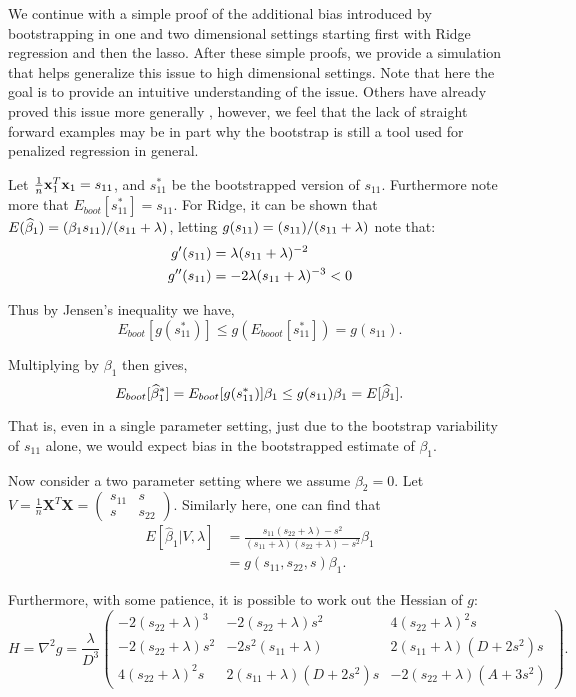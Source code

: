 We continue with a simple proof of the additional bias introduced by bootstrapping in one and two dimensional settings starting first with Ridge regression and then the lasso. After these simple proofs, we provide a simulation that helps generalize this issue to high dimensional settings. Note that here the goal is to provide an intuitive understanding of the issue. Others have already proved this issue more generally \citep{karoui2016, clarté2024}, however, we feel that the lack of straight forward examples may be in part why the bootstrap is still a tool used for penalized regression in general.

Let $\frac{1}{n}\mathbf{x}_1^T\mathbf{x}_1 = s_{11}$, and $s_{11}^*$ be the bootstrapped version of $s_{11}$. Furthermore note more that $E_{boot}[s_{11}^*] = s_{11}$. For Ridge, it can be shown that $E(\widehat{\beta}_1) = (\beta_1s_{11})/(s_{11} + \lambda)$, letting $g(s_{11}) = (s_{11})/(s_{11} + \lambda)$ note that:
$$
\begin{aligned}
g'(s_{11}) &= \lambda (s_{11} + \lambda)^{-2} \\
g''(s_{11}) &= -2\lambda (s_{11} + \lambda)^{-3} < 0
\end{aligned}
$$

\noindent Thus by Jensen's inequality we have,
$$
E_{boot}[g(s_{11}^*)] \leq g(E_{booot}[s_{11}^*]) = g(s_11).
$$

\noindent Multiplying by $\beta_1$ then gives,
$$
E_{boot}[\widehat{\beta}_1^*] = E_{boot}[g(s_{11}^*)]\beta_1 \leq g(s_{11})\beta_1 = E[\widehat{\beta}_1].
$$

\noindent That is, even in a single parameter setting, just due to the bootstrap variability of $s_{11}$ alone, we would expect bias in the bootstrapped estimate of $\beta_1$.

Now consider a two parameter setting where we assume $\beta_2 = 0$. Let $V = \frac{1}{n}\boldsymbol{X}^T\boldsymbol{X} = \begin{pmatrix} s_{11} & s \\ s & s_{22} \end{pmatrix}$. Similarly here, one can find that
$$
\begin{aligned}
E[\hat{\beta}_1 | V, \lambda] &= \frac{s_{11}(s_{22} + \lambda) - s^2}{(s_{11} + \lambda)(s_{22} + \lambda) - s^2} \beta_1 \\
&= g(s_{11}, s_{22}, s)\beta_1.
\end{aligned}
$$

\noindent Furthermore, with some patience, it is possible to work out the Hessian of $g$:
$$
H = \nabla^{2}g
= \frac{\lambda}{D^{3}}
  \begin{pmatrix}
    -2(s_{22}+\lambda)^{3} & -2(s_{22}+\lambda)s^{2} & 4(s_{22}+\lambda)^{2}s\\[6pt]
    -2(s_{22}+\lambda)s^{2} & -2s^{2}(s_{11}+\lambda) & 2(s_{11}+\lambda)(D+2s^{2})s\\[6pt]
     4(s_{22}+\lambda)^{2}s &  2(s_{11}+\lambda)(D+2s^{2})s & -2(s_{22}+\lambda)(A+3s^{2})
  \end{pmatrix}.
$$

